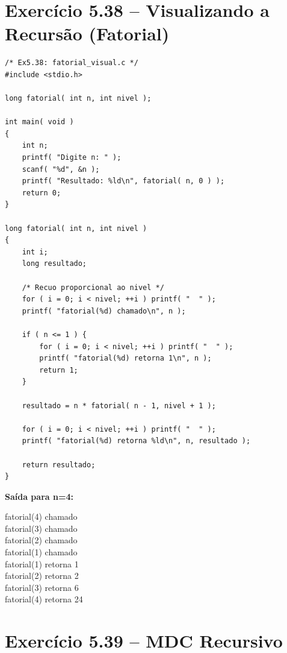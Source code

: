 \documentclass[12pt,a4paper]{article}
\begin{document}
\section{Exercício 5.38 -- Visualizando a Recursão (Fatorial)}

\begin{respostabox}
\begin{lstlisting}
/* Ex5.38: fatorial_visual.c */
#include <stdio.h>

long fatorial( int n, int nivel );

int main( void )
{
    int n;
    printf( "Digite n: " );
    scanf( "%d", &n );
    printf( "Resultado: %ld\n", fatorial( n, 0 ) );
    return 0;
}

long fatorial( int n, int nivel )
{
    int i;
    long resultado;

    /* Recuo proporcional ao nivel */
    for ( i = 0; i < nivel; ++i ) printf( "  " );
    printf( "fatorial(%d) chamado\n", n );

    if ( n <= 1 ) {
        for ( i = 0; i < nivel; ++i ) printf( "  " );
        printf( "fatorial(%d) retorna 1\n", n );
        return 1;
    }

    resultado = n * fatorial( n - 1, nivel + 1 );

    for ( i = 0; i < nivel; ++i ) printf( "  " );
    printf( "fatorial(%d) retorna %ld\n", n, resultado );

    return resultado;
}
\end{lstlisting}

\textbf{Saída para n=4:}
\begin{saida}
fatorial(4) chamado\\
\hphantom{xx}fatorial(3) chamado\\
\hphantom{xxxx}fatorial(2) chamado\\
\hphantom{xxxxxx}fatorial(1) chamado\\
\hphantom{xxxxxx}fatorial(1) retorna 1\\
\hphantom{xxxx}fatorial(2) retorna 2\\
\hphantom{xx}fatorial(3) retorna 6\\
fatorial(4) retorna 24
\end{saida}
\end{respostabox}

\newpage

\section{Exercício 5.39 -- MDC Recursivo}
\end{document}
